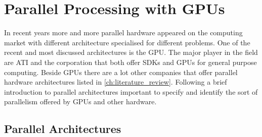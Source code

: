 

\chapter{Parallel Processing with GPUs}%
\label{cha:parallel_processing_with_gpu} 

In recent years more and more parallel hardware appeared on the computing market
with different architecture specialised for different problems. One of the recent
and most discussed architectures is the \gls{GPU}. The major player in the field
are  \gls{ATI} and the  corporation that both offer 
\glspl{SDK} and \glspl{GPU} for general purpose computing. Beside \glspl{GPU} there
are a lot other companies that offer parallel hardware architectures listed in 
\autoref{ch:literature_review}. Following a brief introduction to parallel
 architectures important to specify and identify the sort of parallelism offered
by \glspl{GPU} and other hardware.

\section{Parallel Architectures}
\label{sec:parallel_architectures} 

